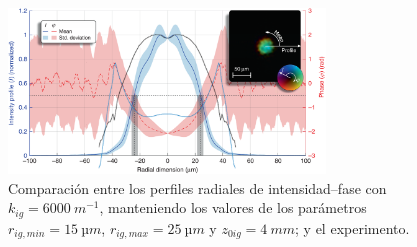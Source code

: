 \begin{figure}[htbp]
  \centering
  \includegraphics[width=0.75\textwidth]{Figuras/anx_cmp_75.png}
  \caption*{Comparación entre los perfiles radiales de intensidad--fase con $k_{ig}=\qty{6000}{m^{-1}}$, manteniendo los valores de los parámetros $r_{ig,min}=\qty{15}{µm}$, $r_{ig,max}=\qty{25}{µm}$ y $z_{0ig}=\qty{4}{mm}$; y el experimento.}
\end{figure}
